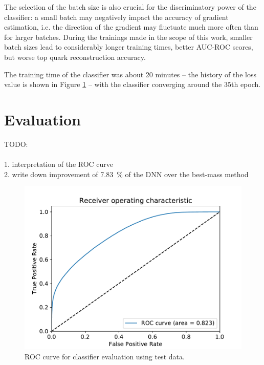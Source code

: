 The selection of the batch size is also crucial for the discriminatory power of the classifier: a small batch may negatively impact the accuracy of gradient estimation, i.e. the direction of the gradient may fluctuate much more often than for larger batches. During the trainings made in the scope of this work, smaller batch sizes lead to considerably longer training times, better AUC-ROC scores, but worse top quark reconstruction accuracy.

The training time of the classifier was about 20 minutes -- the history of the loss value is shown in Figure \ref{fig:ch_4_loss} -- with the classifier converging around the 35th epoch.

\section{Evaluation}

TODO:\\ \\
1. interpretation of the ROC curve\\
2. write down improvement of \SI{7.83}{\%} of the DNN over the best-mass method\\

\begin{figure}[h]
    \centering
    \includegraphics[scale=.75]{assets/chap04/roc_test.pdf}
    \caption{ROC curve for classifier evaluation using test data.}
    \label{fig:ch_4_loss}
\end{figure}

\label{sec:ch-5-eval}